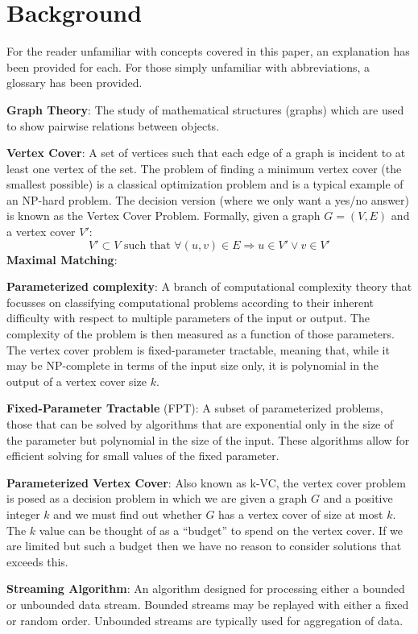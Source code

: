\section{Background}

For the reader unfamiliar with concepts covered in this paper, an
explanation has been provided for each. For those simply unfamiliar with
abbreviations, a glossary has been provided.

\textbf{Graph Theory}: The study of mathematical structures (graphs)
which are used to show pairwise relations between objects.

\textbf{Vertex Cover}: A set of vertices such that each edge of a graph
is incident to at least one vertex of the set. The problem of finding a
minimum vertex cover (the smallest possible) is a classical optimization
problem and is a typical example of an NP-hard problem. The decision
version (where we only want a yes/no answer) is known as the Vertex
Cover Problem. Formally, given a graph \(G = (V, E)\) and a vertex cover
\(V'\): \[
    V' \subset V \text{ such that } \forall (u, v) \in E \Rightarrow u \in V' \vee v \in V'
\] \textbf{Maximal Matching}:

\textbf{Parameterized complexity}: A branch of computational complexity
theory that focusses on classifying computational problems according to
their inherent difficulty with respect to multiple parameters of the
input or output. The complexity of the problem is then measured as a
function of those parameters. The vertex cover problem is
fixed-parameter tractable, meaning that, while it may be NP-complete in
terms of the input size only, it is polynomial in the output of a vertex
cover size \(k\).

\textbf{Fixed-Parameter Tractable} (FPT): A subset of parameterized
problems, those that can be solved by algorithms that are exponential
only in the size of the parameter but polynomial in the size of the
input. These algorithms allow for efficient solving for small values of
the fixed parameter.

\textbf{Parameterized Vertex Cover}: Also known as k-VC, the vertex
cover problem is posed as a decision problem in which we are given a
graph \(G\) and a positive integer \(k\) and we must find out whether
\(G\) has a vertex cover of size at most \(k\). The \(k\) value can be
thought of as a ``budget'' to spend on the vertex cover. If we are
limited but such a budget then we have no reason to consider solutions
that exceeds this.

\textbf{Streaming Algorithm}: An algorithm designed for processing
either a bounded or unbounded data stream. Bounded streams may be
replayed with either a fixed or random order. Unbounded streams are
typically used for aggregation of data.

